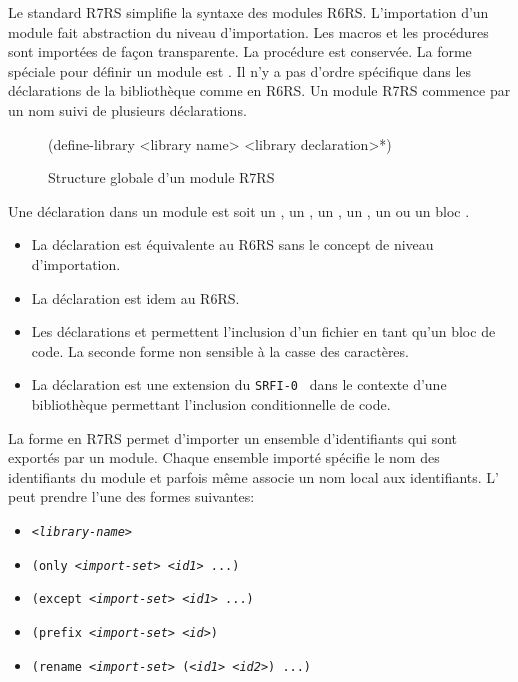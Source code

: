Le standard R7RS\cite{Scheme:R7RS} simplifie la syntaxe des modules
R6RS\cite{Scheme:R6RS}.  L'importation d'un module fait abstraction du niveau
d'importation. Les macros et les procédures sont importées de façon
transparente. La procédure  est conservée. La forme spéciale pour
définir un module est . Il n'y a pas d'ordre spécifique
dans les déclarations de la bibliothèque comme en R6RS. Un module R7RS commence par
un nom suivi de plusieurs déclarations.\\
\begin{figure}[ht]
  \centering
  \begin{mplisting}{0.5}
(define-library <library name>
  <library declaration>*)
\end{mplisting}
  \caption{Structure globale d'un module R7RS}
  \label{fig:syntax->define-library}
\end{figure}

Une déclaration dans un module est soit un , un ,
un , un , un  ou un
bloc .
\begin{itemize}
  \item La déclaration  est équivalente au R6RS sans le concept
    de niveau d'importation.

  \item La déclaration  est idem au R6RS.

  \item Les déclarations  et  permettent
    l'inclusion d'un fichier en tant qu'un bloc de code.  La seconde forme
    non sensible à la casse des caractères.

  \item La déclaration  est une extension du
    \texttt{SRFI-0}~\cite{SRFI-0} dans le contexte d'une bibliothèque
    permettant l'inclusion conditionnelle de code.

\end{itemize}

La forme  en R7RS permet d'importer un ensemble d'identifiants
qui sont exportés par un module. Chaque ensemble importé spécifie le nom des
identifiants du module et parfois même associe un nom local aux identifiants.
L' peut prendre l'une des formes suivantes:
\begin{itemize}
  \label{itm:import-set}
  \item \texttt{\textit{<library-name>}}
  \item \texttt{(only \textit{<import-set>} \textit{<id1>} ...)}
  \item \texttt{(except \textit{<import-set>} \textit{<id1>} ...)}
  \item \texttt{(prefix \textit{<import-set>} \textit{<id>})}
  \item \texttt{(rename \textit{<import-set>} (\textit{<id1>} \textit{<id2>}) ...)}
\end{itemize}


